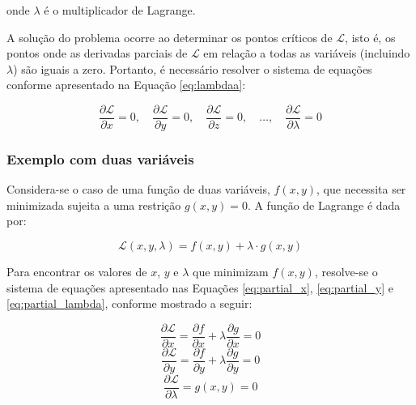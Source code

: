 onde $\lambda$ é o multiplicador de Lagrange.

A solução do problema ocorre ao determinar os pontos críticos de $\mathcal{L}$, isto é, os pontos onde as derivadas parciais de $\mathcal{L}$ em relação a todas as variáveis (incluindo $\lambda$) são iguais a zero. Portanto, é necessário resolver o sistema de equações conforme apresentado na Equação \ref{eq:lambdaa}:

\begin{equation} \frac{\partial \mathcal{L}}{\partial x} = 0, \quad \frac{\partial \mathcal{L}}{\partial y} = 0, \quad \frac{\partial \mathcal{L}}{\partial z} = 0, \quad \dots, \quad \frac{\partial \mathcal{L}}{\partial \lambda} = 0 \label{eq:lambdaa} \end{equation}

\subsubsection{Exemplo com duas variáveis}

Considera-se o caso de uma função de duas variáveis, $f(x, y)$, que necessita ser minimizada sujeita a uma restrição $g(x, y) = 0$. A função de Lagrange é dada por:

\begin{equation}
	\mathcal{L}(x, y, \lambda) = f(x, y) + \lambda \cdot g(x, y)
	\label{eq:lagrange_two_variable}
\end{equation}

Para encontrar os valores de $x$, $y$ e $\lambda$ que minimizam $f(x, y)$, resolve-se o sistema de equações apresentado nas Equações \ref{eq:partial_x}, \ref{eq:partial_y} e \ref{eq:partial_lambda}, conforme mostrado a seguir:

\begin{equation}
	\frac{\partial \mathcal{L}}{\partial x} = \frac{\partial f}{\partial x} + \lambda \frac{\partial g}{\partial x} = 0
	\label{eq:partial_x}
\end{equation}
\begin{equation}
	\frac{\partial \mathcal{L}}{\partial y} = \frac{\partial f}{\partial y} + \lambda \frac{\partial g}{\partial y} = 0
	\label{eq:partial_y}
\end{equation}
\begin{equation}
	\frac{\partial \mathcal{L}}{\partial \lambda} = g(x, y) = 0
	\label{eq:partial_lambda}
\end{equation}

